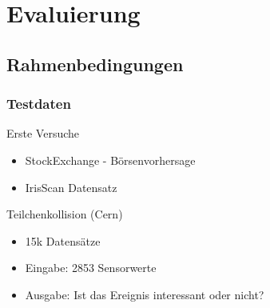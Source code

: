 \documentclass[18pt]{beamer}
\begin{document}
	\section{Evaluierung}
	\subsection{Rahmenbedingungen}
	\begin{frame}[c]\frametitle{Testdaten}
		\begin{block}{Erste Versuche}
		    \begin{itemize}
		    	\item StockExchange - Börsenvorhersage
		    	\item IrisScan Datensatz
		    \end{itemize}
		\end{block}
		\begin{block}{Teilchenkollision (Cern)}
		    \begin{itemize}
		    	\item 15k Datensätze
		    	\item Eingabe: 2853 Sensorwerte
				\item Ausgabe: Ist das Ereignis interessant oder nicht? 
		    \end{itemize}
		\end{block}		
	\end{frame}
\end{document}

